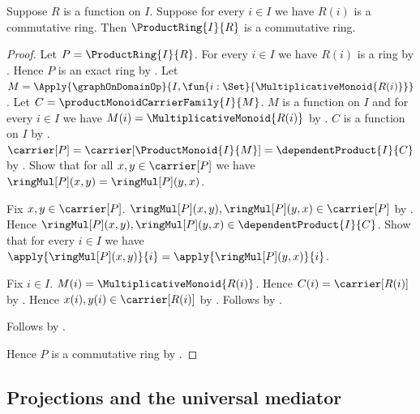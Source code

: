 \begin{theorem}\label{product_ring_is_commutative}
    Suppose $R$ is a function on $I$.
    Suppose for every $i\in I$ we have $R(i)$ is a commutative ring.
    Then $\ProductRing{I}{R}$ is a commutative ring.
\end{theorem}
\begin{proof}
    Let $P=\ProductRing{I}{R}$.
    For every $i\in I$ we have $R(i)$ is a ring by
        .
    Hence $P$ is an exact ring by .
    Let $M=\Apply{\graphOnDomainOp}{
        I,\fun{i:\Set}{\MultiplicativeMonoid{R(i)}}}$.
    Let $C=\productMonoidCarrierFamily{I}{M}$.
    $M$ is a function on $I$ and for every $i\in I$ we have
        $M(i)=\MultiplicativeMonoid{R(i)}$ by
        .
    $C$ is a function on $I$ by
        .
    $\carrier[P]=\carrier[\ProductMonoid{I}{M}]
        =\dependentProduct{I}{C}$ by
        .
    Show that for all $x,y\in\carrier[P]$ we have
        $\ringMul[P](x,y)=\ringMul[P](y,x)$.
    \begin{subproof}
        Fix $x,y\in\carrier[P]$.
        $\ringMul[P](x,y),\ringMul[P](y,x)\in\carrier[P]$ by
            .
        Hence $\ringMul[P](x,y),\ringMul[P](y,x)
            \in\dependentProduct{I}{C}$.
        Show that for every $i\in I$ we have
            $\apply{\ringMul[P](x,y)}{i}
                =\apply{\ringMul[P](y,x)}{i}$.
        \begin{subproof}
            Fix $i\in I$.
            $M(i)=\MultiplicativeMonoid{R(i)}$.
            Hence $C(i)=\carrier[R(i)]$ by
                .
            Hence $x(i),y(i)\in\carrier[R(i)]$ by
                .
            Follows by
                .
        \end{subproof}
        Follows by .
    \end{subproof}
    Hence $P$ is a commutative ring by
        .
\end{proof}

\subsection{Projections and the universal mediator}


